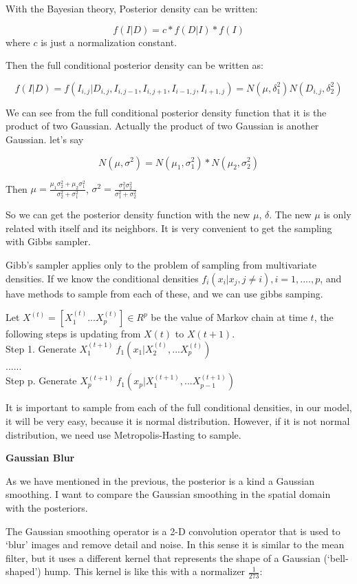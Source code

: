 \documentclass[11pt] {article}
\begin{document}
With the Bayesian theory, Posterior density can be written:

$$f(I|D) =c*f(D|I)*f(I)$$ where $c$ is just a normalization constant. 

Then the full conditional posterior density can be written as:

$$f(I|D)=f(I_{i,j}|D_{i,j},I_{i,j-1},I_{i,j+1},I_{i-1,j},I_{i+1,j})=N(\mu,\delta_1^2)N(D_{i,j},\delta_2^2)$$

We can see from the full conditional posterior density function that it is the product of two Gaussian. Actually the product of two Gaussian is another Gaussian.  let's say 

$$N(\mu,\sigma^2)=N(\mu_1,\sigma_1^2)*N(\mu_2,\sigma_2^2)$$

Then $\mu=\frac{\mu_1\sigma_2^2+\mu_2\sigma_1^2}{\sigma_2^2+\sigma_1^2}$, $\sigma^2 = \frac {\sigma_1^2  \sigma_2^2} {\sigma_1^2+\sigma_2^2} $

So we can get the posterior density function with the new $\mu$, $\delta$. The new $\mu$ is only related with itself and its neighbors. It is very convenient to get the sampling with Gibbs sampler.

Gibb's sampler applies only to the problem of sampling from multivariate densities. If we know the conditional densities $f_i(x_i|x_j,j  \neq i),i=1,....,p$, and have methods to sample from each of these, and we can use gibbs samping. 

Let $ X^{(t)}= [X_1^{(t)} ...  X_p^{(t)}]\in R ^p$ be the value of Markov chain at time $t$, the following steps is updating from $X(t)$ to $X(t+1)$. \\
Step 1. Generate $X_1^{(t+1)} ~ f_1(x_1|X_2^{(t)},...X_p^{(t)})$ \\
...... \\
Step p. Generate $X_p^{(t+1)} ~ f_1(x_p|X_1^{(t+1)},...X_{p-1}^{(t+1)})$


It is important to sample from each of the full conditional densities, in our model, it will be very easy, because it is normal distribution. However, if it is not normal distribution, we need use Metropolis-Hasting to sample. 

\noindent \textbf{Gaussian Blur}

As we have mentioned in the previous, the posterior is a kind a Gaussian smoothing. I want to compare the Gaussian smoothing in the spatial domain with the posteriors. 

The Gaussian smoothing operator is a 2-D convolution operator that is used to `blur' images and remove detail and noise. In this sense it is similar to the mean filter, but it uses a different kernel that represents the shape of a Gaussian (`bell-shaped') hump. This kernel is like this with a normalizer $\frac{1}{273}$:
\end{document}

